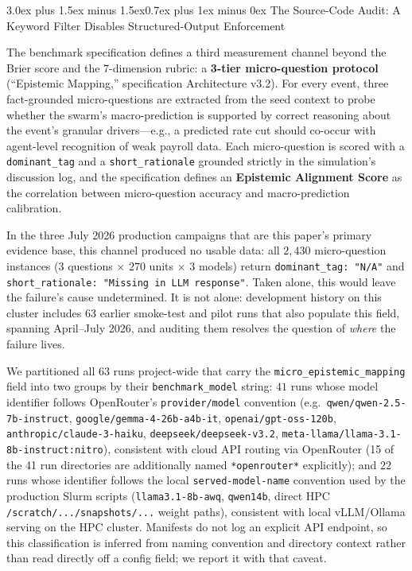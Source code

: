\documentclass[11pt,journal,onecolumn]{IEEEtran}
\makeatletter
\renewcommand\section{\@startsection{section}{1}{\z@}%
  {3.0ex plus 1.5ex minus 1.5ex}{0.7ex plus 1ex minus 0ex}%
  {\normalfont\normalsize\centering\bfseries}}
\makeatother
\begin{document}
\section{The Source-Code Audit: A Keyword Filter Disables Structured-Output Enforcement}
\label{sec:epistemic_mapping}

The benchmark specification defines a third measurement channel beyond the Brier score and the 7-dimension rubric: a \textbf{3-tier micro-question protocol} (``Epistemic Mapping,'' specification Architecture v3.2). For every event, three fact-grounded micro-questions are extracted from the seed context to probe whether the swarm's macro-prediction is supported by correct reasoning about the event's granular drivers---e.g., a predicted rate cut should co-occur with agent-level recognition of weak payroll data. Each micro-question is scored with a \texttt{dominant\_tag} and a \texttt{short\_rationale} grounded strictly in the simulation's discussion log, and the specification defines an \textbf{Epistemic Alignment Score} as the correlation between micro-question accuracy and macro-prediction calibration.

In the three July 2026 production campaigns that are this paper's primary evidence base, this channel produced no usable data: all $2{,}430$ micro-question instances ($3$ questions $\times$ $270$ units $\times$ $3$ models) return \texttt{dominant\_tag: "N/A"} and \texttt{short\_rationale: "Missing in LLM response"}. Taken alone, this would leave the failure's cause undetermined. It is not alone: development history on this cluster includes 63 earlier smoke-test and pilot runs that also populate this field, spanning April--July 2026, and auditing them resolves the question of \emph{where} the failure lives.

We partitioned all $63$ runs project-wide that carry the \texttt{micro\_epistemic\_mapping} field into two groups by their \texttt{benchmark\_model} string: $41$ runs whose model identifier follows OpenRouter's \texttt{provider/model} convention (e.g.\ \texttt{qwen/qwen-2.5-7b-instruct}, \texttt{google/gemma-4-26b-a4b-it}, \texttt{openai/gpt-oss-120b}, \texttt{anthropic/claude-3-haiku}, \texttt{deepseek/deepseek-v3.2}, \texttt{meta-llama/llama-3.1-8b-instruct:nitro}), consistent with cloud API routing via OpenRouter (15 of the 41 run directories are additionally named \texttt{*openrouter*} explicitly); and $22$ runs whose identifier follows the local \texttt{served-model-name} convention used by the production Slurm scripts (\texttt{llama3.1-8b-awq}, \texttt{qwen14b}, direct HPC \texttt{/scratch/.../snapshots/...} weight paths), consistent with local vLLM/Ollama serving on the HPC cluster. Manifests do not log an explicit API endpoint, so this classification is inferred from naming convention and directory context rather than read directly off a config field; we report it with that caveat.
\end{document}
